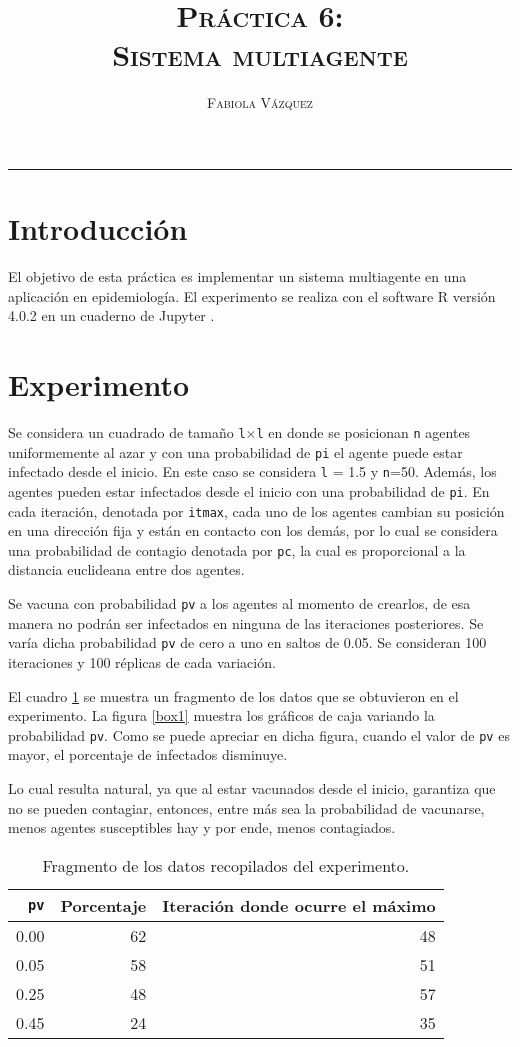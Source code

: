 \documentclass[12pt,letterpaper]{article}
\title{\textsc{Práctica 6: \\ Sistema multiagente}}
\author{\textsc{Fabiola Vázquez}}
\begin{document}
\maketitle

\hrule
\section{Introducción}
El objetivo de esta práctica \cite{elisapractica6} es implementar un sistema multiagente en una aplicación en epidemiología. El experimento se realiza con el software R versión 4.0.2 \cite{R} en un cuaderno de Jupyter \cite{jupyter}. 

\section{Experimento}
Se considera un cuadrado de tamaño \texttt{l}$\times$\texttt{l} en donde se posicionan \texttt{n} agentes uniformemente al azar y con una probabilidad de \texttt{pi} el agente puede estar infectado desde el inicio. En este caso se considera \texttt{l} = 1.5 y \texttt{n}=50. Además, los agentes pueden estar infectados desde el inicio con una probabilidad de \texttt{pi}. En cada iteración, denotada por \texttt{itmax}, cada uno de los agentes cambian su posición en una dirección fija y están en contacto con los demás,  por lo cual se considera una probabilidad de contagio denotada por \texttt{pc}, la cual es proporcional a la distancia euclideana entre dos agentes.

Se vacuna con probabilidad \texttt{pv} a los agentes al momento de crearlos, de esa manera no podrán ser infectados en ninguna de las iteraciones posteriores. Se varía dicha probabilidad \texttt{pv} de cero a uno en saltos de 0.05. Se consideran 100 iteraciones y 100 réplicas de cada variación. 

El cuadro \ref{datos} se muestra un fragmento de los datos que se obtuvieron en el experimento. La figura \ref{box1} muestra los gráficos de caja variando la probabilidad \texttt{pv}. Como se puede apreciar en dicha figura, cuando el valor de \texttt{pv} es mayor, el porcentaje de infectados disminuye.

Lo cual resulta natural, ya que al estar vacunados desde el inicio, garantiza que no se pueden contagiar, entonces, entre más sea la probabilidad de vacunarse, menos agentes susceptibles hay y por ende, menos contagiados.

\begin{table}
\centering
\caption{Fragmento de los datos recopilados del experimento.}
\begin{tabular}{rrr}
  \hline
\texttt{pv} & Porcentaje & Iteración donde ocurre el máximo \\ 
  \hline
0.00 & 62 & 48 \\ 
0.05 & 58 & 51 \\ 
0.25 & 48 & 57 \\ 
0.45 & 24 & 35 \\ 
   \hline
\end{tabular}
\label{datos}
\end{table}
 
\end{document}
